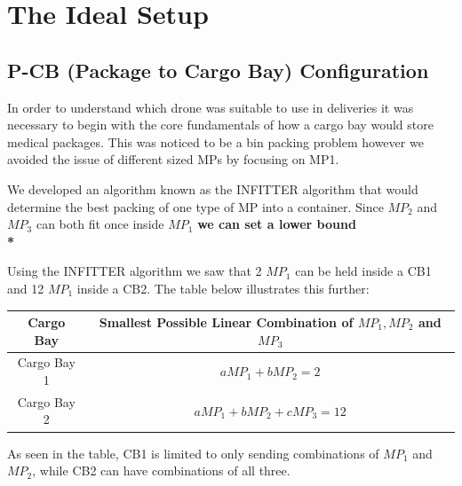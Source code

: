 \documentclass[a4paper,12pt]{article}
\begin{document}
\section{The Ideal Setup}

\subsection{P-CB (Package to Cargo Bay) Configuration}

In order to understand which drone was suitable to use in deliveries it was necessary to begin with the core fundamentals
of how a cargo bay would store medical packages. This was noticed to be a bin packing problem however we avoided the issue of different sized MPs by focusing on MP1.

We developed an algorithm known as the INFITTER algorithm that would determine the best packing of one type of MP into a container.
Since $MP_2$ and $MP_3$ can both fit once inside $MP_1$ \bf{we can set a lower bound} \\*

Using the INFITTER algorithm we saw that 2 $MP_1$ can be held inside a CB1 and 12 $MP_1$ inside a CB2.  The table below illustrates this further:

\begin{center}
\begin{tabular}{ |c|c| }
 \hline
 Cargo Bay & Smallest Possible Linear Combination of $MP_1, MP_2$ and $MP_3$\\\hline
 Cargo Bay 1 & $aMP_1 + bMP_2 = 2$  \\
 Cargo Bay 2 & $aMP_1 + bMP_2 + cMP_3 = 12$ \\
 \hline
\end{tabular}
\end{center}

As seen in the table, CB1 is limited to only sending combinations of $MP_1$ and $MP_2$, while CB2 can have combinations of all three.
\end{document}
